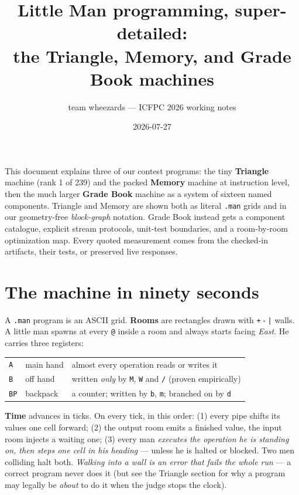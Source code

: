 \documentclass[11pt,a4paper]{article}
\title{Little Man programming, super-detailed:\\the \textbf{Triangle},
\textbf{Memory}, and \textbf{Grade Book} machines}
\author{team wheezards --- ICFPC 2026 working notes}
\date{2026-07-27}
\newcommand{\op}[1]{\texttt{#1}}
\begin{document}
\maketitle

\noindent This document explains three of our contest programs:
the tiny \textbf{Triangle} machine (rank 1 of 239) and the packed
\textbf{Memory} machine at instruction level, then the much larger
\textbf{Grade Book} machine as a system of sixteen named components.
Triangle and Memory are shown both as literal \texttt{.man} grids and in our
geometry-free \emph{block-graph} notation. Grade Book instead gets a
component catalogue, explicit stream protocols, unit-test boundaries, and a
room-by-room optimization map. Every quoted measurement comes from the
checked-in artifacts, their tests, or preserved live responses.

\tableofcontents
\clearpage

\section{The machine in ninety seconds}

A \texttt{.man} program is an ASCII grid. \textbf{Rooms} are rectangles drawn
with \op{+}\,\op{-}\,\op{|} walls. A little man spawns at every \op{@} inside
a room and always starts facing \emph{East}. He carries three registers:

\begin{center}
\begin{tabular}{lll}
\op{A} & main hand & almost every operation reads or writes it\\
\op{B} & off hand & written \emph{only} by \op{M}, \op{W} and \op{/} (proven empirically)\\
\op{BP} & backpack & a counter; written by \op{b}, \op{m}; branched on by \op{d}\\
\end{tabular}
\end{center}

\textbf{Time} advances in ticks. On every tick, in this order:
(1) every pipe shifts its values one cell forward;
(2) the output room emits a finished value, the input room injects a waiting one;
(3) every man \emph{executes the operation he is standing on, then steps one
cell in his heading} --- unless he is halted or blocked.
Two men colliding halt both. \emph{Walking into a wall is an error that fails
the whole run} --- a correct program never does it (but see the Triangle
section for why a program may legally be \emph{about} to do it when the judge
stops the clock).
\end{document}
